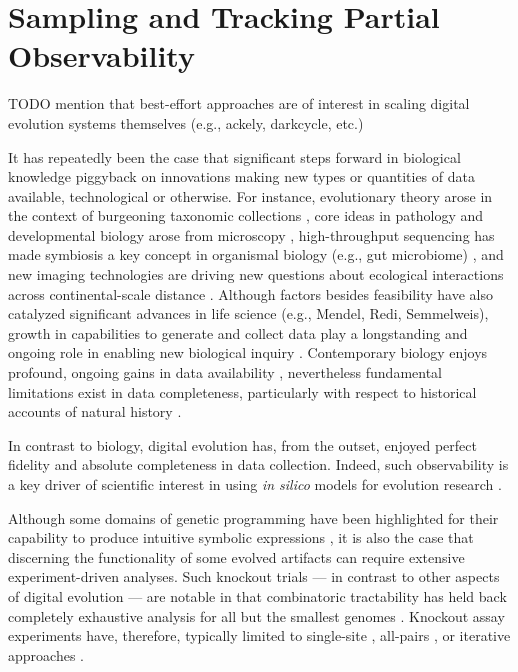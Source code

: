 \section{Sampling and Tracking Partial Observability}
\label{sec:best-effort}

TODO mention that best-effort approaches are of interest in scaling digital evolution systems themselves (e.g., ackely, darkcycle, etc.)

\citep{moreno2022hstrat,moreno2024guide}

It has repeatedly been the case that significant steps forward in biological knowledge piggyback on innovations making new types or quantities of data available, technological or otherwise.
For instance, evolutionary theory arose in the context of burgeoning taxonomic collections \citep{winsor2009taxonomy}, core ideas in pathology and developmental biology arose from microscopy \citep{turner1890cell}, high-throughput sequencing has made symbiosis a key concept in organismal biology (e.g., gut microbiome) \citep{durack2019gut}, and new imaging technologies are driving new questions about ecological interactions across continental-scale distance \citep{stark2016toward}.
Although factors besides feasibility have also catalyzed significant advances in life science (e.g., Mendel, Redi, Semmelweis), growth in capabilities to generate and collect data play a longstanding and ongoing role in enabling new biological inquiry \citep{strasser2012data}.
Contemporary biology enjoys profound, ongoing gains in data availability \citep{sulston1983embryonic,sheth2017multiplex,weeks2023deep}, nevertheless fundamental limitations exist in data completeness, particularly with respect to historical accounts of natural history \citep{benton2011assessing,delsuc2005phylogenomics}.

In contrast to biology, digital evolution has, from the outset, enjoyed perfect fidelity and absolute completeness in data collection.
Indeed, such observability is a key driver of scientific interest in using \textit{in silico} models for evolution research \citep{o2003digital}.

Although some domains of genetic programming have been highlighted for their capability to produce intuitive symbolic expressions \citep{hu2023genetic,javed2022simplification}, it is also the case that discerning the functionality of some evolved artifacts can require extensive experiment-driven analyses.
Such knockout trials --- in contrast to other aspects of digital evolution --- are notable in that combinatoric tractability has held back completely exhaustive analysis for all but the smallest genomes \citep{nitash2021information}.
Knockout assay experiments have, therefore, typically limited to single-site \citep{adami2006digital}, all-pairs \citep{kumawat2023fluctuating}, or iterative approaches \citep{langdon2014improving,moreno2021case}.

